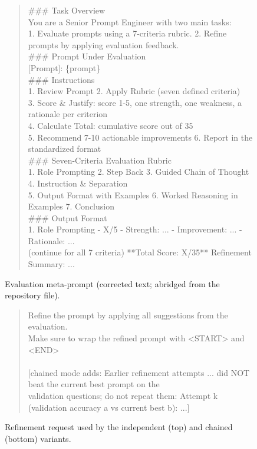 \documentclass{ieeeaccess}
\begin{document}
\begin{figure}[htbp]
\centering
\begin{quote}\ttfamily\small
\#\#\# Task Overview\\{}
You are a Senior Prompt Engineer with two main tasks:\\{}
1. Evaluate prompts using a 7-criteria rubric.  2. Refine prompts by applying evaluation feedback.\\{}
\#\#\# Prompt Under Evaluation\\{}
[Prompt]: \{prompt\}\\{}
\#\#\# Instructions\\{}
1. Review Prompt  2. Apply Rubric (seven defined criteria)\\{}
3. Score \& Justify: score 1-5, one strength, one weakness, a rationale per criterion\\{}
4. Calculate Total: cumulative score out of 35\\{}
5. Recommend 7-10 actionable improvements  6. Report in the standardized format\\{}
\#\#\# Seven-Criteria Evaluation Rubric\\{}
1. Role Prompting  2. Step Back  3. Guided Chain of Thought  4. Instruction \& Separation\\{}
5. Output Format with Examples  6. Worked Reasoning in Examples  7. Conclusion\\{}
\#\#\# Output Format\\{}
1. Role Prompting - X/5 - Strength: ... - Improvement: ... - Rationale: ...\\{}
(continue for all 7 criteria)   **Total Score: X/35**   Refinement Summary: ...\\{}
\end{quote}
\caption{Evaluation meta-prompt (corrected text; abridged from the repository file).}
\end{figure}

\begin{figure}[htbp]
\centering
\begin{quote}\ttfamily\small
Refine the prompt by applying all suggestions from the evaluation.\\{}
Make sure to wrap the refined prompt with <START> and <END>\\{}
~\\{}
[chained mode adds: Earlier refinement attempts ... did NOT beat the current best prompt on the\\{}
 validation questions; do not repeat them: Attempt k (validation accuracy a vs current best b): ...]\\{}
\end{quote}
\caption{Refinement request used by the independent (top) and chained (bottom) variants.}
\end{figure}
\end{document}
